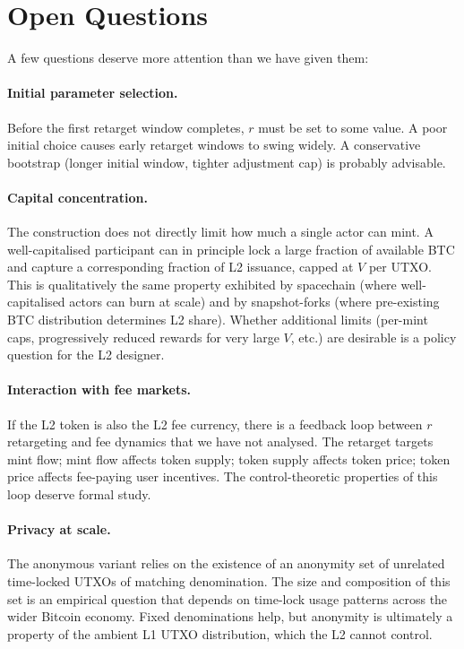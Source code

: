 \documentclass[11pt,a4paper]{article}
\begin{document}
\section{Open Questions}

A few questions deserve more attention than we have given them:

\paragraph{Initial parameter selection.} Before the first retarget window completes, $r$ must be set to some value. A poor initial choice causes early retarget windows to swing widely. A conservative bootstrap (longer initial window, tighter adjustment cap) is probably advisable.

\paragraph{Capital concentration.} The construction does not directly limit how much a single actor can mint. A well-capitalised participant can in principle lock a large fraction of available BTC and capture a corresponding fraction of L2 issuance, capped at $V$ per UTXO. This is qualitatively the same property exhibited by spacechain (where well-capitalised actors can burn at scale) and by snapshot-forks (where pre-existing BTC distribution determines L2 share). Whether additional limits (per-mint caps, progressively reduced rewards for very large $V$, etc.) are desirable is a policy question for the L2 designer.

\paragraph{Interaction with fee markets.} If the L2 token is also the L2 fee currency, there is a feedback loop between $r$ retargeting and fee dynamics that we have not analysed. The retarget targets mint flow; mint flow affects token supply; token supply affects token price; token price affects fee-paying user incentives. The control-theoretic properties of this loop deserve formal study.

\paragraph{Privacy at scale.} The anonymous variant relies on the existence of an anonymity set of unrelated time-locked UTXOs of matching denomination. The size and composition of this set is an empirical question that depends on time-lock usage patterns across the wider Bitcoin economy. Fixed denominations help, but anonymity is ultimately a property of the ambient L1 UTXO distribution, which the L2 cannot control.
\end{document}
